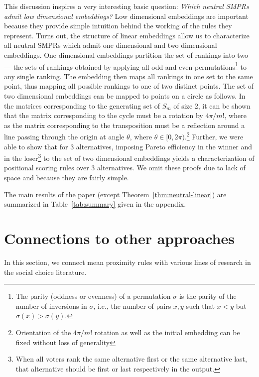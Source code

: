 \documentclass[prodmode,acmec]{ec-acmsmall}
\begin{document}
This discussion inspires a very interesting basic question: \emph{Which neutral SMPRs admit low dimensional embeddings?} Low dimensional embeddings are important because they provide simple intuition behind the working of the rules they represent. Turns out, the structure of linear embeddings allow us to characterize all neutral SMPRs which admit one dimensional and two dimensional embeddings. One dimensional embeddings partition the set of rankings into two --- the sets of rankings obtained by applying all odd and even permutations\footnote{The parity (oddness or evenness) of a permutation $\sigma$ is the parity of the number of inversions in $\sigma$, i.e., the number of pairs $x,y$ such that $x < y$ but $\sigma(x) > \sigma(y)$.} to any single ranking. The embedding then maps all rankings in one set to the same point, thus mapping all possible rankings to one of two distinct points. The set of two dimensional embeddings can be mapped to points on a circle as follows. In the matrices corresponding to the generating set of $S_m$ of size $2$, it can be shown that the matrix corresponding to the cycle must be a rotation by $4 \pi / m!$, where as the matrix corresponding to the transposition must be a reflection around a line passing through the origin at angle $\theta$, where $\theta \in [0,2\pi)$.\footnote{Orientation of the $4\pi/m!$ rotation as well as the initial embedding can be fixed without loss of generality} Further, we were able to show that for $3$ alternatives, imposing Pareto efficiency in the winner and in the loser\footnote{When all voters rank the same alternative first or the same alternative last, that alternative should be first or last respectively in the output.} to the set of two dimensional embeddings yields a characterization of positional scoring rules over $3$ alternatives. We omit these proofs due to lack of space and because they are fairly simple. 

The main results of the paper (except Theorem~\ref{thm:neutral-linear}) are summarized in Table~\ref{tab:summary} given in the appendix.


\section{Connections to other approaches}
\label{sec:connection}
In this section, we connect mean proximity rules with various lines of research in the social choice literature. 
\end{document}
